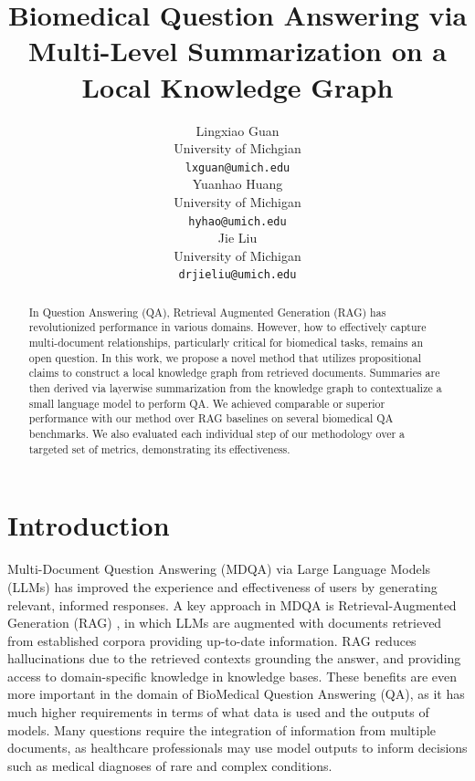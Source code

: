 \documentclass[11pt]{article}
\title{Biomedical Question Answering via Multi-Level Summarization on a Local Knowledge Graph}
\author{Lingxiao Guan \\
  University of Michgian \\
  \texttt{lxguan@umich.edu}\\\And
  Yuanhao Huang \\
  University of Michigan \\
  \texttt{hyhao@umich.edu}\\\And
  Jie Liu \\
  University of Michigan \\
  \texttt{drjieliu@umich.edu}}
\theoremstyle{definition}
\begin{document}
\maketitle
\begin{abstract}
In Question Answering (QA), Retrieval Augmented Generation (RAG) has revolutionized performance in various domains. However, how to effectively capture multi-document relationships, particularly critical for biomedical tasks, remains an open question. In this work, we propose a novel method that utilizes propositional claims to construct a local knowledge graph from retrieved documents. Summaries are then derived via layerwise summarization from the knowledge graph to contextualize a small language model to perform QA. We achieved comparable or superior performance with our method over RAG baselines on several biomedical QA benchmarks. We also evaluated each individual step of our methodology over a targeted set of metrics, demonstrating its effectiveness.
\end{abstract}

\section{Introduction}

Multi-Document Question Answering (MDQA) via Large Language Models (LLMs) has improved the experience and effectiveness of users by generating relevant, informed responses. A key approach in MDQA is Retrieval-Augmented Generation (RAG) \cite{DBLP:conf/nips/LewisPPPKGKLYR020}, in which LLMs are augmented with documents retrieved from established corpora providing up-to-date information. RAG reduces hallucinations due to the retrieved contexts grounding the answer, and providing access to domain-specific knowledge in knowledge bases. These benefits are even more important in the domain of BioMedical Question Answering (QA), as it has much higher requirements in terms of what data is used and the outputs of models. Many questions require the integration of information from multiple documents, as healthcare professionals may use model outputs to inform decisions such as medical diagnoses of rare and complex conditions.
\end{document}
